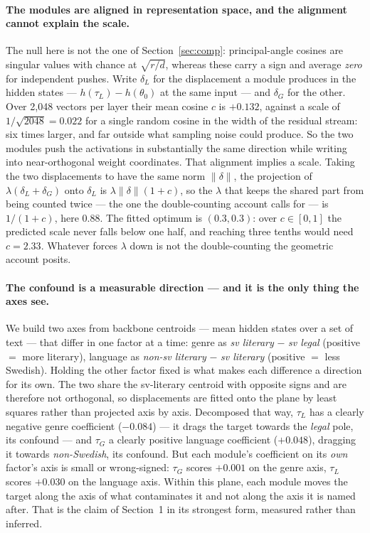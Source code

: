 \documentclass[10pt,twocolumn,a4paper]{article}
\begin{document}
\paragraph{The modules are aligned in representation space, and the alignment
cannot explain the scale.} The null here is not the one of
Section~\ref{sec:comp}: principal-angle cosines are singular values with chance
at $\sqrt{r/d}$, whereas these carry a sign and average \emph{zero} for
independent pushes. Write $\delta_L$ for the displacement a module produces in
the hidden states --- $h(\tau_L)-h(\theta_0)$ at the same input --- and
$\delta_G$ for the other. Over 2{,}048 vectors per layer their mean cosine $c$
is $+0.132$, against a scale of $1/\sqrt{2048}=0.022$ for a single random cosine
in the width of the residual stream: six times larger, and far outside what
sampling noise could produce. So the two modules push the activations in substantially the same
direction while writing into near-orthogonal weight coordinates. That alignment
implies a scale. Taking the two displacements to have the same norm
$\lVert\delta\rVert$, the projection of $\lambda(\delta_L+\delta_G)$ onto
$\delta_L$ is $\lambda\lVert\delta\rVert(1+c)$, so the $\lambda$ that keeps the
shared part from being counted twice --- the one the double-counting account
calls for --- is $1/(1+c)$, here $0.88$. The fitted optimum is $(0.3,0.3)$: over $c\in[0,1]$ the
predicted scale never falls below one half, and reaching three tenths would need
$c=2.33$. Whatever forces $\lambda$ down is not the double-counting the
geometric account posits.

\paragraph{The confound is a measurable direction --- and it is the only thing
the axes see.} We build two axes from backbone centroids --- mean hidden states
over a set of text --- that differ in one factor at a time: genre as \emph{sv
literary} $-$ \emph{sv legal} (positive $=$ more literary), language as
\emph{non-sv literary} $-$ \emph{sv literary} (positive $=$ less Swedish).
Holding the other factor fixed is what makes each difference a direction for its
own. The two share the sv-literary centroid with opposite signs and are
therefore not orthogonal, so displacements are fitted onto the plane by least
squares rather than projected axis by axis. Decomposed that way,
$\tau_L$ has a clearly negative genre coefficient ($-0.084$) --- it drags the
target towards the \emph{legal} pole, its confound --- and $\tau_G$ a clearly
positive language coefficient ($+0.048$), dragging it towards
\emph{non-Swedish}, its confound. But each module's coefficient on its
\emph{own} factor's axis is small or wrong-signed: $\tau_G$ scores $+0.001$ on
the genre axis, $\tau_L$ scores $+0.030$ on the language axis. Within this
plane, each module moves the target along the axis of what contaminates it and
not along the axis it is named after. That is the claim of Section~1 in its
strongest form, measured rather than inferred.
\end{document}
